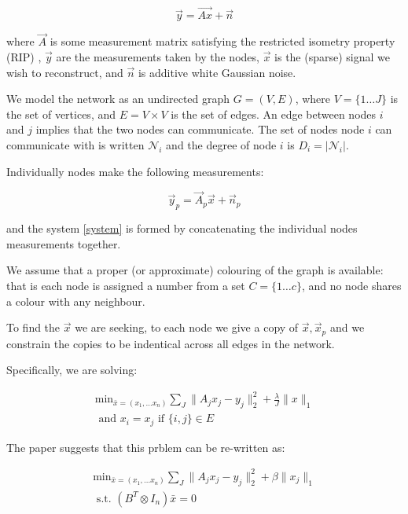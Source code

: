 \documentclass{article}
\begin{document}
\begin{equation}
\vec{y} = \vec{Ax} + \vec{n}
\label{system}
\end{equation}

where \(\vec{A}\) is some measurement matrix satisfying the restricted isometry property (RIP) \cite{Candes2006}, \(\vec{y}\) are the measurements taken by the nodes, \(\vec{x}\) is the (sparse) signal we wish to reconstruct, and \(\vec{n}\) is additive white Gaussian noise. 

We model the network as an undirected graph \(G = \left(V,E\right)\), where \(V = \{1 \ldots J\}\) is the set of vertices, and \(E = V \times V\) is the set of edges. An edge between nodes \(i\) and \(j\) implies that the two nodes can communicate. The set of nodes node \(i\) can communicate with is written \(\mathcal{N}_i\) and the degree of node \(i\) is \(D_i = |\mathcal{N}_i|\). 

Individually nodes make the following measurements:

\begin{equation}
\vec{y}_p = \vec{A}_p\vec{x} + \vec{n}_p
\end{equation}

and the system \eqref{system} is formed by concatenating the individual nodes measurements together.

We assume that a proper (or approximate) colouring of the graph is available: that is each node is assigned a number from a set \(C = \{1 \ldots c \} \), and no node shares a colour with any neighbour.

To find the \(\vec{x}\) we are seeking, to each node we give a copy of \(\vec{x}, \vec{x}_p\) and we constrain the copies to be indentical across all edges in the network. 

Specifically, we are solving:

\begin{align}
\text{min}_{\bar{x} = \left(x_1, \ldots x_n\right)} \sum_J \|A_jx_j - y_j\|_2^2 + \frac{\lambda}{J}\|x\|_1
\\
\text{ and } x_i = x_j \text{ if } \{i,j\} \in E 
\label{constrainedbp}
\end{align}


The paper \cite{mota2013d} suggests that this prblem can be re-written as:

\begin{align}
\text{min}_{\bar{x} = \left(x_1, \ldots x_n\right)} \sum_J \|A_jx_j - y_j\|_2^2 + \beta\|x_j\|_1
\\
\text{ s.t. } \left(B^T \otimes I_n\right)\bar{x} = 0
\label{constrainedbp1}
\end{align}
\end{document}
